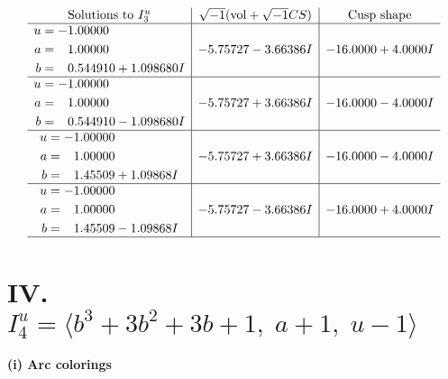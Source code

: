 \documentclass[1p]{elsarticle_modified}
\theoremstyle{definition}
\newcommand{\I}{\sqrt{-1}}
\begin{document}
$$\begin{array}{c|c|c}  
\text{Solutions to }I^u_{3}& \I (\text{vol} + \sqrt{-1}CS) & \text{Cusp shape}\\
 \hline 
\begin{aligned}
u &= -1.00000\phantom{ +0.000000I} \\
a &= \phantom{-}1.00000\phantom{ +0.000000I} \\
b &= \phantom{-}0.544910 + 1.098680 I\end{aligned}
 & -5.75727 - 3.66386 I & -16.0000 + 4.0000 I \\ \hline\begin{aligned}
u &= -1.00000\phantom{ +0.000000I} \\
a &= \phantom{-}1.00000\phantom{ +0.000000I} \\
b &= \phantom{-}0.544910 - 1.098680 I\end{aligned}
 & -5.75727 + 3.66386 I & -16.0000 - 4.0000 I \\ \hline\begin{aligned}
u &= -1.00000\phantom{ +0.000000I} \\
a &= \phantom{-}1.00000\phantom{ +0.000000I} \\
b &= \phantom{-}1.45509 + 1.09868 I\end{aligned}
 & -5.75727 + 3.66386 I & -16.0000 - 4.0000 I \\ \hline\begin{aligned}
u &= -1.00000\phantom{ +0.000000I} \\
a &= \phantom{-}1.00000\phantom{ +0.000000I} \\
b &= \phantom{-}1.45509 - 1.09868 I\end{aligned}
 & -5.75727 - 3.66386 I & -16.0000 + 4.0000 I\\
 \hline 
 \end{array}$$\newpage\newpage\renewcommand{\arraystretch}{1}
\centering \section*{IV. $I^u_{4}= \langle b^3+3 b^2+3 b+1,\;a+1,\;u-1 \rangle$}
\flushleft \textbf{(i) Arc colorings}\\
\end{document}

